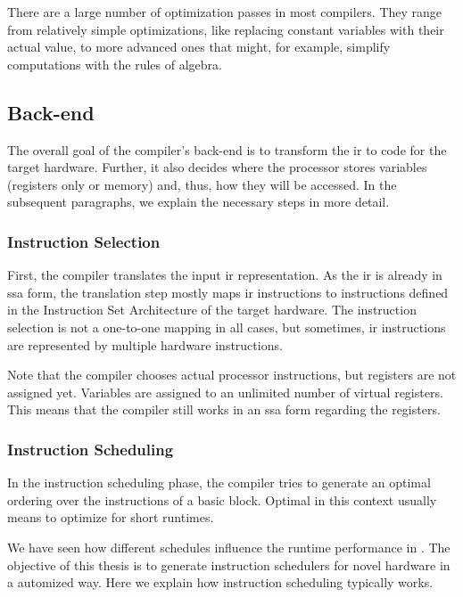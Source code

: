 There are a large number of optimization passes in most compilers.
They range from relatively simple optimizations, like replacing constant variables with their actual value, to more advanced ones that might, for example, simplify computations with the rules of algebra.

\subsection{Back-end}
\label{sec:bg:compilers:backend}
The overall goal of the compiler's back-end is to transform the \ac{ir} to code for the target hardware.
Further, it also decides where the processor stores variables (registers only or memory) and, thus, how they will be accessed.
In the subsequent paragraphs, we explain the necessary steps in more detail.

\subsubsection{Instruction Selection}
First, the compiler translates the input \ac{ir} representation.
As the \ac{ir} is already in \ac{ssa} form, the translation step mostly maps \ac{ir} instructions to instructions defined in the Instruction Set Architecture of the target hardware.
The instruction selection is not a one-to-one mapping in all cases, but sometimes, \ac{ir} instructions are represented by multiple hardware instructions.

Note that the compiler chooses actual processor instructions, but registers are not assigned yet.
Variables are assigned to an unlimited number of virtual registers.
This means that the compiler still works in an \ac{ssa} form regarding the registers.

\subsubsection{Instruction Scheduling}
In the instruction scheduling phase, the compiler tries to generate an optimal ordering over the instructions of a basic block.
Optimal in this context usually means to optimize for short runtimes.

We have seen how different schedules influence the runtime performance in .
The objective of this thesis is to generate instruction schedulers for novel hardware in a automized way.
Here we explain how instruction scheduling typically works.

